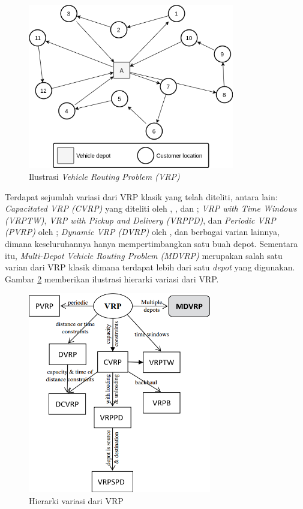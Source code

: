 \begin{figure}[!]
	\centering
	\includegraphics[width=9cm]{Resources/Images/vrp-ilustration}
	\caption{Ilustrasi \textit{Vehicle Routing Problem (VRP)}}
	\label{fig:vrp-ilustration}
\end{figure}


Terdapat sejumlah variasi dari VRP klasik yang telah diteliti, antara lain: \textit{Capacitated VRP (CVRP)} yang diteliti oleh \citep{baldacci_exact_2010}, \citep{cordeau_chapter_2007}, dan \citep{toth_vehicle_2002}; \textit{VRP with Time Windows (VRPTW)}, \textit{VRP with Pickup and Delivery (VRPPD)}, dan \textit{Periodic VRP (PVRP)} oleh \citep{solomon_survey_1988}; \textit{Dynamic VRP (DVRP)} oleh \citep{psaraftis_dynamic_1995}, dan berbagai varian lainnya, dimana keseluruhannya hanya mempertimbangkan satu buah depot. Sementara itu, \textit{Multi-Depot Vehicle Routing Problem (MDVRP)} merupakan salah satu varian dari VRP klasik dimana terdapat lebih dari satu \textit{depot} yang digunakan. Gambar \ref{fig:vrp-variants} memberikan ilustrasi hierarki variasi dari VRP.


\begin{figure}[!]
	\centering
	\includegraphics[width=8cm]{Resources/Images/vrp-variants}
	\caption{Hierarki variasi dari VRP \citep{weise_solving_2009}}
	\label{fig:vrp-variants}
\end{figure}


